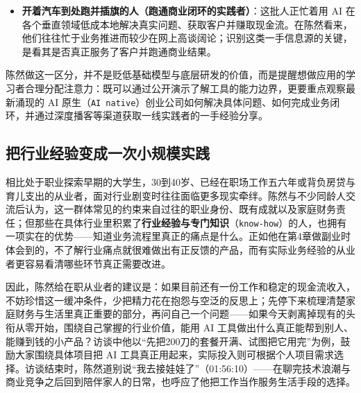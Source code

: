 \documentclass[UTF8,a4paper,11pt,fontset=fandol]{ctexart}
\begin{document}
\begin{itemize}
\item \textbf{开着汽车到处跑并插旗的人（跑通商业闭环的实践者）}：这批人正忙着用 AI 在各个垂直领域低成本地解决真实问题、获取客户并赚取现金流。在陈然看来，他们往往忙于业务推进而较少在网上高谈阔论；识别这类一手信息源的关键，是看其是否真正服务了客户并跑通商业结果。
\end{itemize}

陈然做这一区分，并不是贬低基础模型与底层研发的价值，而是提醒想做应用的学习者合理分配注意力：既可以通过公开演示了解工具的能力边界，更要重点观察最新涌现的 AI 原生（\texttt{AI native}）创业公司如何解决具体问题、如何完成业务闭环，并通过深度播客等渠道获取一线实践者的一手经验分享。

\subsection{把行业经验变成一次小规模实践}
相比处于职业探索早期的大学生，30到40岁、已经在职场工作五六年或背负房贷与育儿支出的从业者，面对行业剧变时往往面临更多现实牵绊。陈然与不少同龄人交流后认为，这一群体常见的约束来自过往的职业身份、既有成就以及家庭财务责任；但那些在具体行业里积累了\textbf{行业经验与专门知识}（\texttt{know-how}）的人，也拥有一项实在的优势——知道业务流程里真正的痛点是什么。正如他在第4章做副业时体会到的，不了解行业痛点就很难做出有正反馈的产品，而有实际业务经验的从业者更容易看清哪些环节真正需要改进。

因此，陈然给在职从业者的建议是：如果目前还有一份工作和稳定的现金流收入，不妨珍惜这一缓冲条件，少把精力花在抱怨与空泛的反思上；先停下来梳理清楚家庭财务与生活里真正重要的部分，再问自己一个问题——如果今天剥离掉现有的头衔从零开始，围绕自己掌握的行业价值，能用 AI 工具做出什么真正能帮到别人、能赚到钱的小产品？访谈中他以“先把200刀的套餐开满、试图把它用完”为例，鼓励大家围绕具体项目把 AI 工具真正用起来，实际投入则可根据个人项目需求选择。访谈结束时，陈然道别说“我去接娃娃了”（01:56:10）——在聊完技术浪潮与商业竞争之后回到陪伴家人的日常，也呼应了他把工作当作服务生活手段的选择。
\end{document}
